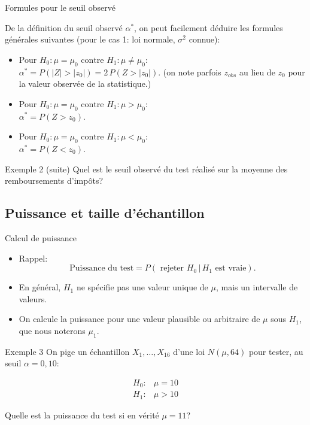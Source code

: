 \documentclass{BeamerTemplate}
\begin{document}
\begin{frame}[t]{Formules pour le seuil observé}

 {\small
 De la définition du seuil observé $\alpha^*$, on peut facilement déduire
les formules générales suivantes (pour le cas 1: loi normale, $\sigma^2$ connue):

 \begin{itemize}\itemsep4mm
 \item Pour $H_0 : \mu = \mu_0 \mbox{ contre } H_1 : \mu \neq \mu_0$:\\
 $\alpha^*=P(|Z|>|z_{0}|)=2\,P(Z>|z_{0}|)$. {\scriptsize (on note parfois $z_{obs}$ au lieu de $z_0$ pour la valeur observée de la statistique.)}
 \item Pour $H_0 : \mu = \mu_0 \mbox{ contre } H_1 : \mu > \mu_0$:\\
 $\alpha^*=P(Z>z_{0})$.
 \item Pour $H_0 : \mu = \mu_0 \mbox{ contre } H_1 : \mu < \mu_0$:\\
 $\alpha^*=P(Z<z_{0})$.
 \end{itemize}
 }
\end{frame}

\begin{frame}[t]{Exemple 2 (suite)}
Quel est le seuil observé du test réalisé sur la moyenne des remboursements d'impôts?
{\ }
\end{frame}



\subsection{Puissance et taille d'échantillon}

\begin{frame}[t]{Calcul de puissance}

\begin{itemize}\itemsep7mm
\item Rappel: $$\text{Puissance du test}=P(\text{ rejeter } H_0\,|\,H_1 \text{  est vraie}).$$
\item En général, $H_1$ ne spécifie pas une valeur unique de $\mu$, mais un intervalle de valeurs.
\item On calcule la puissance pour une valeur plausible ou arbitraire de $\mu$ sous $H_1$, que nous noterons $\mu_1$.
\end{itemize}
\end{frame}

\begin{frame}[t]{Exemple 3}
On pige un échantillon $X_1, \ldots, X_{16}$  d'une loi $N(\mu, 64)$ pour tester, au seuil $\alpha = 0,10$:

 $$\begin{array}{ll}
 H_0 : &\mu = 10\\ H_1 : &\mu > 10
 \end{array}$$

 Quelle est la puissance du test si en vérité $\mu = 11$?
\end{frame}
\end{document}
